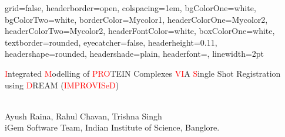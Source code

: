 \documentclass[a0paper,portrait]{baposter}
\begin{document}

\begin{poster}
{
grid=false,
headerborder=open, %
colspacing=1em, %
bgColorOne=white, %
bgColorTwo=white, %
borderColor=Mycolor1, %
headerColorOne=Mycolor2, %
headerColorTwo=Mycolor2, %
headerFontColor=white, %
boxColorOne=white, %
textborder=rounded, %
eyecatcher=false, %
headerheight=0.11\textheight, %
headershape=rounded, %
headershade=plain,
headerfont=\Large\textsf, %
linewidth=2pt %
}
{}
%
%
{

\vspace{1cm}
\textsf %
{
{\fontsize{18}{22}\selectfont \textcolor{red}{I}ntegrated \textcolor{red}{M}odelling of \textcolor{red}{PRO}TEIN Complexes \textcolor{red}{VI}A \textcolor{red}{S}ingle Shot Registration using \textcolor{red}{D}REAM (\textcolor{red}{IMPROVISeD})}
}
} %
{\sf\vspace{0.2em}\\
Ayush Raina, Rahul Chavan, Trishna Singh \\  
iGem Software Team, Indian Institute of Science, Banglore.\\

}
\end{poster}
\end{document}
